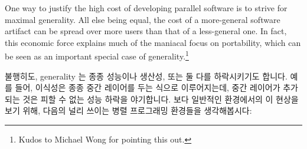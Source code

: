One way to justify the high cost of developing parallel software
is to strive for maximal generality.
All else being equal, the cost of a more-general software artifact
can be spread over more users than that of a less-general one.
In fact, this economic force explains much of the maniacal focus
on portability, which can be seen as an important special case
of generality.\footnote{
	Kudos to Michael Wong for pointing this out.}
\fi

불행히도, generality 는 종종 성능이나 생산성, 또는 둘 다를 하락시키기도 합니다.
예를 들어, 이식성은 종종 중간 레이어를 두는 식으로 이루어지는데, 중간 레이어가
추가되는 것은 피할 수 없는 성능 하락을 야기합니다.
보다 일반적인 환경에서의 이 현상을 보기 위해, 다음의 널리 쓰이는 병렬
프로그래밍 환경들을 생각해봅시다:

